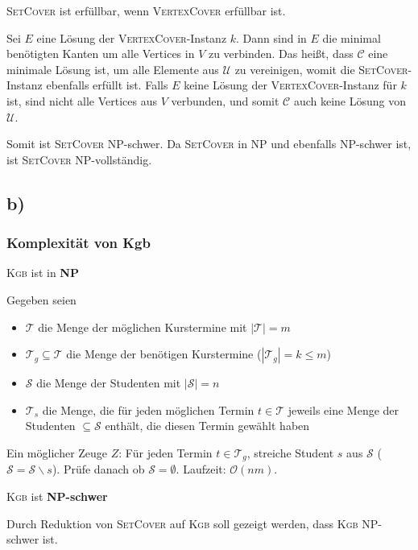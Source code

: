 \documentclass{article}
\begin{document}
\smallskip

\textsc{SetCover} ist erfüllbar, wenn \textsc{VertexCover} erfüllbar ist.

Sei $E$ eine Lösung der \textsc{VertexCover}-Instanz $k$. Dann sind in $E$ die minimal benötigten Kanten um alle Vertices in $V$ zu verbinden. Das heißt, dass $\mathcal{C}$ eine minimale Lösung ist, um alle Elemente aus $\mathcal{U}$ zu vereinigen, womit die \textsc{SetCover}-Instanz ebenfalls erfüllt ist.
Falls $E$ keine Lösung der \textsc{VertexCover}-Instanz für $k$ ist, sind nicht alle Vertices aus $V$ verbunden, und somit $\mathcal{C}$ auch keine Lösung von $\mathcal{U}$.

\bigskip 

Somit ist \textsc{SetCover} NP-schwer. Da \textsc{SetCover} in NP und ebenfalls NP-schwer ist, ist \textsc{SetCover} NP-vollständig.


\subsection*{b)}
\subsubsection*{Komplexität von Kgb}
\textsc{Kgb} ist in \textbf{NP}

Gegeben seien
\begin{itemize}
	\item $\mathcal{T}$ die Menge der möglichen Kurstermine mit $|\mathcal{T}| = m$
  \item $\mathcal{T}_g \subseteq \mathcal{T}$ die Menge der benötigen Kurstermine ($|\mathcal{T}_g| = k \leq m$)
  \item $\mathcal{S}$ die Menge der Studenten mit $|\mathcal{S}| = n$
  \item $\mathcal{T}_s$ die Menge, die für jeden möglichen Termin $t \in \mathcal{T}$ jeweils eine Menge der Studenten $\subseteq \mathcal{S}$ enthält, die diesen Termin gewählt haben
\end{itemize}

Ein möglicher Zeuge $Z$: Für jeden Termin $t \in \mathcal{T}_g$, streiche Student $s$ aus $\mathcal{S}$ ($\mathcal{S}=\mathcal{S}\backslash s$). Prüfe  danach ob $\mathcal{S} = \emptyset$. Laufzeit: $\mathcal{O}(nm)$.

\bigskip

\textsc{Kgb} ist \textbf{NP-schwer}

Durch Reduktion von \textsc{SetCover} auf \textsc{Kgb} soll gezeigt werden, dass \textsc{Kgb} NP-schwer ist.
\end{document}
